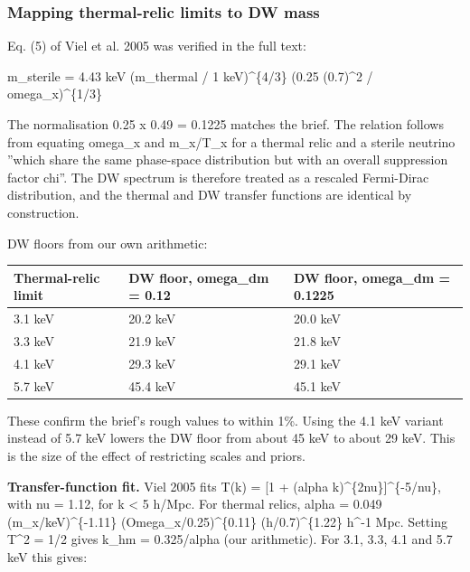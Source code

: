 \documentclass[11pt,a4paper]{article}
\begin{document}
\subsubsection{Mapping thermal-relic limits to DW mass}
Eq. (5) of Viel et al. 2005 was verified in the full text:

m\_sterile = 4.43 keV (m\_thermal / 1 keV)\textasciicircum{}\{4/3\} (0.25 (0.7)\textasciicircum{}2 / omega\_x)\textasciicircum{}\{1/3\}

The normalisation 0.25 x 0.49 = 0.1225 matches the brief. The relation follows from equating omega\_x and m\_x/T\_x for a thermal relic and a sterile neutrino ''which share the same phase-space distribution but with an overall suppression factor chi''. The DW spectrum is therefore treated as a rescaled Fermi-Dirac distribution, and the thermal and DW transfer functions are identical by construction.

DW floors from our own arithmetic:

\begin{longtable}{@{}p{}p{}p{}@{}}
\toprule
\textbf{Thermal-relic limit} & \textbf{DW floor, omega\_dm = 0.12} & \textbf{DW floor, omega\_dm = 0.1225} \\ \midrule \endhead
3.1 keV & 20.2 keV & 20.0 keV \\
3.3 keV & 21.9 keV & 21.8 keV \\
4.1 keV & 29.3 keV & 29.1 keV \\
5.7 keV & 45.4 keV & 45.1 keV \\
\bottomrule\end{longtable}
These confirm the brief's rough values to within 1\%. Using the 4.1 keV variant instead of 5.7 keV lowers the DW floor from about 45 keV to about 29 keV. This is the size of the effect of restricting scales and priors.

\textbf{Transfer-function fit.} Viel 2005 fits T(k) = [1 + (alpha k)\textasciicircum{}\{2nu\}]\textasciicircum{}\{-5/nu\}, with nu = 1.12, for k \textless{} 5 h/Mpc. For thermal relics, alpha = 0.049 (m\_x/keV)\textasciicircum{}\{-1.11\} (Omega\_x/0.25)\textasciicircum{}\{0.11\} (h/0.7)\textasciicircum{}\{1.22\} h\textasciicircum{}-1 Mpc. Setting T\textasciicircum{}2 = 1/2 gives k\_hm = 0.325/alpha (our arithmetic). For 3.1, 3.3, 4.1 and 5.7 keV this gives:
\end{document}
